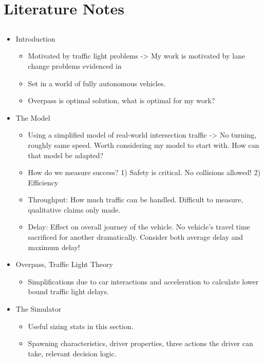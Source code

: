 \chapter{Literature Notes}
\label{cha:Literature Notes}

\section{}
\label{sec:Dresner2004}
\begin{itemize}
\item Introduction
\begin{itemize}
\item Motivated by traffic light problems -> My work is motivated by lane change problems evidenced in \citet{Laval2006}
\item Set in a world of fully autonomous vehicles.
\item Overpass is optimal solution, what is optimal for my work?
\end{itemize}
\item The Model
\begin{itemize}
\item Using a simplified model of real-world intersection traffic -> No turning, roughly same speed. Worth considering my model to start with. How can that model be adapted?
\item How do we measure success? 1) Safety is critical. No collisions allowed! 2) Efficiency
\item Throughput: How much traffic can be handled. Difficult to measure, qualitative claims only made.
\item Delay: Effect on overall journey of the vehicle. No vehicle's travel time sacrificed for another dramatically. Consider both average delay and maximum delay!
\end{itemize}
\item Overpass, Traffic Light Theory
\begin{itemize}
\item Simplifications due to car interactions and acceleration to calculate lower bound traffic light delays.
\end{itemize}
\item The Simulator
\begin{itemize}
\item Useful sizing stats in this section.
\item Spawning characteristics, driver properties, three actions the driver can take, relevant decision logic.

\end{itemize}
\end{itemize}
